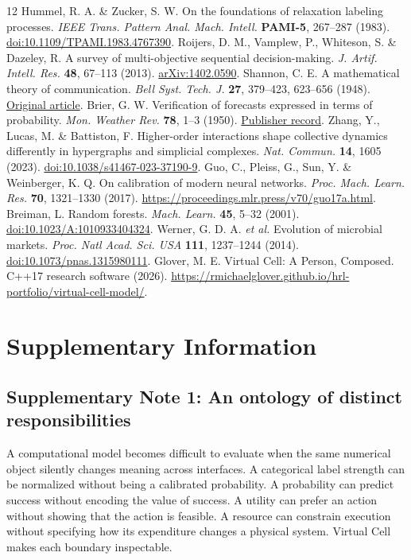 \documentclass[10pt,a4paper]{article}
\begin{document}
\begin{thebibliography}{12}
 Hummel, R. A. \& Zucker, S. W. On the foundations of relaxation labeling processes. \textit{IEEE Trans. Pattern Anal. Mach. Intell.} \textbf{PAMI-5}, 267--287 (1983). \href{https://doi.org/10.1109/TPAMI.1983.4767390}{doi:10.1109/TPAMI.1983.4767390}.
 Roijers, D. M., Vamplew, P., Whiteson, S. \& Dazeley, R. A survey of multi-objective sequential decision-making. \textit{J. Artif. Intell. Res.} \textbf{48}, 67--113 (2013). \href{https://arxiv.org/abs/1402.0590}{arXiv:1402.0590}.
 Shannon, C. E. A mathematical theory of communication. \textit{Bell Syst. Tech. J.} \textbf{27}, 379--423, 623--656 (1948). \href{https://www.princeton.edu/~wbialek/rome/refs/shannon_48.pdf}{Original article}.
 Brier, G. W. Verification of forecasts expressed in terms of probability. \textit{Mon. Weather Rev.} \textbf{78}, 1--3 (1950). \href{https://journals.ametsoc.org/view/journals/mwre/78/1/1520-0493_1950_078_0001_vofeit_2_0_co_2.xml}{Publisher record}.
 Zhang, Y., Lucas, M. \& Battiston, F. Higher-order interactions shape collective dynamics differently in hypergraphs and simplicial complexes. \textit{Nat. Commun.} \textbf{14}, 1605 (2023). \href{https://doi.org/10.1038/s41467-023-37190-9}{doi:10.1038/s41467-023-37190-9}.
 Guo, C., Pleiss, G., Sun, Y. \& Weinberger, K. Q. On calibration of modern neural networks. \textit{Proc. Mach. Learn. Res.} \textbf{70}, 1321--1330 (2017). \url{https://proceedings.mlr.press/v70/guo17a.html}.
 Breiman, L. Random forests. \textit{Mach. Learn.} \textbf{45}, 5--32 (2001). \href{https://doi.org/10.1023/A:1010933404324}{doi:10.1023/A:1010933404324}.
 Werner, G. D. A. \textit{et al.} Evolution of microbial markets. \textit{Proc. Natl Acad. Sci. USA} \textbf{111}, 1237--1244 (2014). \href{https://doi.org/10.1073/pnas.1315980111}{doi:10.1073/pnas.1315980111}.
 Glover, M. E. Virtual Cell: A Person, Composed. C++17 research software (2026). \url{https://rmichaelglover.github.io/hrl-portfolio/virtual-cell-model/}.
\end{thebibliography}

\clearpage
\appendix
\section*{Supplementary Information}
\subsection*{Supplementary Note 1: An ontology of distinct responsibilities}
A computational model becomes difficult to evaluate when the same numerical object silently changes meaning across interfaces. A categorical label strength can be normalized without being a calibrated probability. A probability can predict success without encoding the value of success. A utility can prefer an action without showing that the action is feasible. A resource can constrain execution without specifying how its expenditure changes a physical system. Virtual Cell makes each boundary inspectable.
\end{document}
